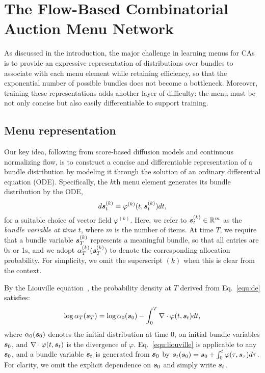 \section{The Flow-Based Combinatorial Auction Menu Network}

As discussed in the introduction, the major challenge in learning menus for CAs is 
to provide an expressive representation of distributions over bundles
to associate with each menu element while retaining efficiency, so that
the exponential number of possible bundles does not become a bottleneck.
Moreover, training these representations adds another layer of difficulty: the menu must be not only concise but also easily differentiable to support training. 

\subsection{Menu representation}

Our key idea, following from score-based diffusion models and continuous normalizing flow, is to construct a concise and differentiable representation of a bundle distribution by modeling it through the solution of an ordinary differential equation (ODE). Specifically, the $k$th menu element generates its bundle distribution by the ODE,
%
\begin{equation}
    d{\bm{s}}^{(k)}_t = \varphi^{(k)}(t,{\bm{s}}^{(k)}_t) dt,\label{equ:de}
\end{equation}
%
for a suitable choice of vector field $\varphi^{(k)}$.
%
Here, we refer to ${\bm{s}}^{(k)}_t\in \mathbb{R}^m$ as the \emph{bundle variable at time $t$}, where $m$ is the number of items. At time $T$, we require that a bundle variable ${\bm{s}}^{(k)}_T$ represents a meaningful bundle, so that all entries are 0s or 1s,
and we adopt $\alpha^{(k)}_T({\bm{s}}^{(k)}_T)$ to denote the corresponding allocation probability. 
For simplicity, we omit the superscript $(k)$ when this is clear from the context.

By the  Liouville equation~\cite{liouville1838note}, the probability density at $T$ derived from Eq.~\ref{equ:de} satisfies:
\begin{align}
    \log \alpha_T({\bm{s}}_T) = \log \alpha_0({\bm{s}}_0) - \int_0^T \nabla\cdot \varphi(t, {\bm{s}}_t) dt,\label{equ:liouville}
\end{align}
where $\alpha_0({\bm{s}}_0)$ denotes the initial distribution at time $0$, on initial bundle variables ${\bm{s}}_0$, and $\nabla\cdot \varphi(t, {\bm{s}}_t)$ is the divergence of $\varphi$.   Eq.~\ref{equ:liouville} is applicable to any ${\bm{s}}_0$, and a bundle variable ${\bm{s}}_t$ is generated from ${\bm{s}}_0$ by ${\bm{s}}_t({\bm{s}}_0)={\bm{s}}_0+\int_0^t \varphi(\tau,{\bm{s}}_\tau) d\tau$. For clarity, we omit the explicit dependence on ${\bm{s}}_0$ and simply write ${\bm{s}}_t$.

